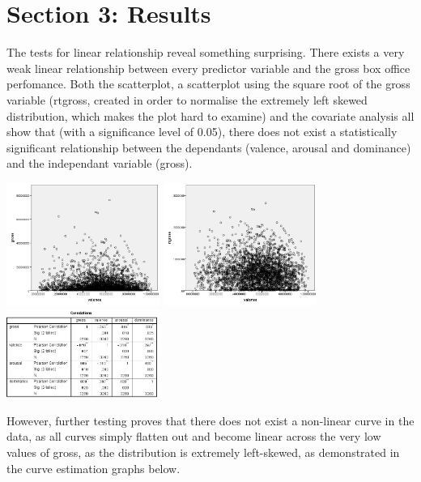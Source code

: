 \documentclass[font=10pt]{article}
\begin{document}
  \section{Section 3: Results}
The tests for linear relationship reveal something surprising. There exists a very weak linear relationship between every predictor variable and the gross box office perfomance. Both the scatterplot, a scatterplot using the square root of the gross variable (rtgross, created in order to normalise the extremely left skewed distribution, which makes the plot hard to examine) and the covariate analysis all show that (with a significance level of 0.05), there does not exist a statistically significant relationship between the dependants (valence, arousal and dominance) and the independant variable (gross).
\newline
\begin{center}
	\includegraphics[width=5cm]{grosstovalence.png}
 	\includegraphics[width=5cm]{rtgrosstovalence.png}
	\includegraphics[width=5cm]{correlations}
\end{center}

However, further testing proves that there does not exist a non-linear curve in the data, as all curves simply flatten out and become linear across the very low values of gross, as the distribution is extremely left-skewed, as demonstrated in the curve estimation graphs below.
\end{document}
